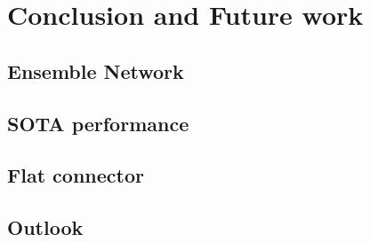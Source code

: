 \chapter{Conclusion and Future work}
\label{chap:conclusion}

\section{Ensemble Network}
\label{sec:ensembleconclusion}

\section{SOTA performance}
\label{sec:sotaperformance}

\section{Flat connector}
\label{sec:flatconnector}

\section{Outlook}
\label{sec:outlook}